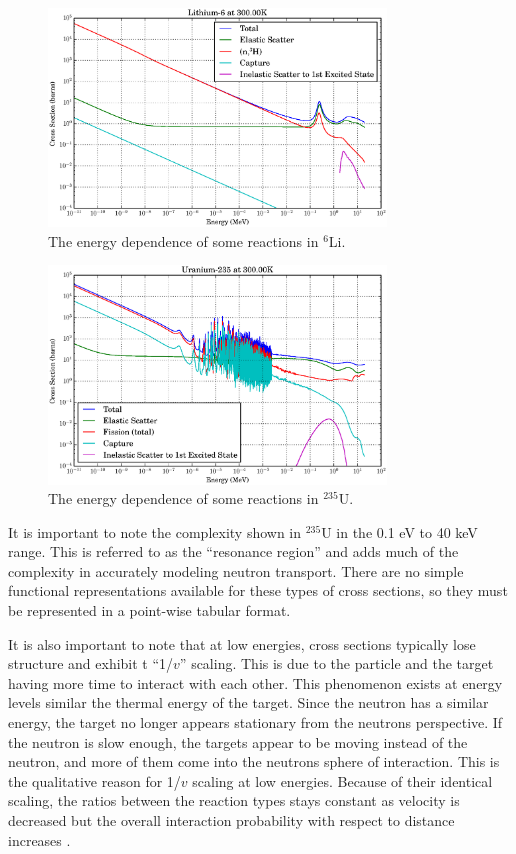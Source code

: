 \begin{figure}[h!]
  \centering
    \includegraphics[width=0.8\textwidth]{graphics/xs_li6.eps}
     \caption{The energy dependence of some reactions in $^6$Li.\label{xs_e_dependence_li}}
\end{figure}

\begin{figure}[h!]
  \centering
    \includegraphics[width=0.8\textwidth]{graphics/xs_u235.eps}
    \caption{The energy dependence of some reactions in $^{235}$U.   \label{xs_e_dependence_u}}
\end{figure}

It is important to note the complexity shown in $^{235}$U in the 0.1 eV to 40 keV range.  This is referred to as the ``resonance region'' and adds much of the complexity in accurately modeling neutron transport.  There are no simple functional representations available for these types of cross sections, so they must be represented in a point-wise tabular format.  

It is also important to note that at low energies, cross sections typically lose structure and exhibit t ``1/$v$'' scaling.  This is due to the particle and the target having more time to interact with each other.  This phenomenon exists at energy levels similar the thermal energy of the target.  Since the neutron has a similar energy, the target no longer appears stationary from the neutrons perspective.  If the neutron is slow enough, the targets appear to be moving instead of the neutron, and more of them come into the neutrons sphere of interaction.  This is the qualitative reason for 1/$v$ scaling at low energies.  Because of their identical scaling, the ratios between the reaction types stays constant as velocity is decreased but the overall interaction probability with respect to distance increases \cite{duderstadt}.

